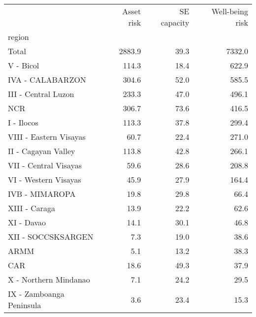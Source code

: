 \begin{tabular}{lrrr}
\toprule
{} &  Asset risk &  SE capacity &  Well-being risk \\
region                   &             &              &                  \\
\midrule
Total                    &      2883.9 &         39.3 &           7332.0 \\
V - Bicol                &       114.3 &         18.4 &            622.9 \\
IVA - CALABARZON         &       304.6 &         52.0 &            585.5 \\
III - Central Luzon      &       233.3 &         47.0 &            496.1 \\
NCR                      &       306.7 &         73.6 &            416.5 \\
I - Ilocos               &       113.3 &         37.8 &            299.4 \\
VIII - Eastern Visayas   &        60.7 &         22.4 &            271.0 \\
II - Cagayan Valley      &       113.8 &         42.8 &            266.1 \\
VII - Central Visayas    &        59.6 &         28.6 &            208.8 \\
VI - Western Visayas     &        45.9 &         27.9 &            164.4 \\
IVB - MIMAROPA           &        19.8 &         29.8 &             66.4 \\
XIII - Caraga            &        13.9 &         22.2 &             62.6 \\
XI - Davao               &        14.1 &         30.1 &             46.8 \\
XII - SOCCSKSARGEN       &         7.3 &         19.0 &             38.6 \\
ARMM                     &         5.1 &         13.2 &             38.3 \\
CAR                      &        18.6 &         49.3 &             37.9 \\
X - Northern Mindanao    &         7.1 &         24.2 &             29.5 \\
IX - Zamboanga Peninsula &         3.6 &         23.4 &             15.3 \\
\bottomrule
\end{tabular}
